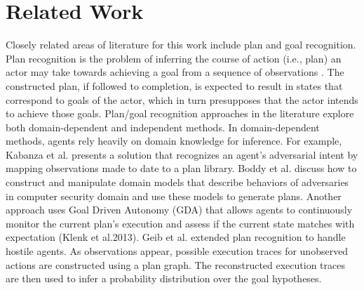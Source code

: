 \documentclass[letterpaper]{article}
\theoremstyle{plain}
\begin{document}
\section{Related Work}
\label{sec:relatedwork}
Closely related areas of literature for this work include plan and goal recognition. Plan recognition is the problem of inferring the course of action (i.e., plan) an actor may take towards achieving a goal from a sequence of observations \cite{schmidt1978plan,kautz1986generalized}. The constructed plan, if followed to completion, is expected to result in states that correspond to goals of the actor, which in turn presupposes that the actor intends to achieve those goals. 
Plan/goal recognition approaches in the literature explore both domain-dependent and independent methods. In domain-dependent methods, agents rely heavily on domain knowledge for inference. For example, Kabanza et al.   presents a solution that recognizes an agent’s adversarial intent by mapping observations made to date to a plan library. Boddy et al.  discuss how to construct and manipulate domain models that describe behaviors of adversaries in computer security domain and use these models to generate plans. Another approach uses Goal Driven Autonomy (GDA) that allows agents to continuously monitor the current plan’s execution and assess if the current state matches with expectation (Klenk et al.2013)\nocite{aha2013gda}. Geib et al.  extended plan recognition to handle hostile agents. As observations appear, possible execution traces for unobserved actions are constructed using a plan graph. The reconstructed execution traces are then used to infer a probability distribution over the goal hypotheses.
\end{document}
